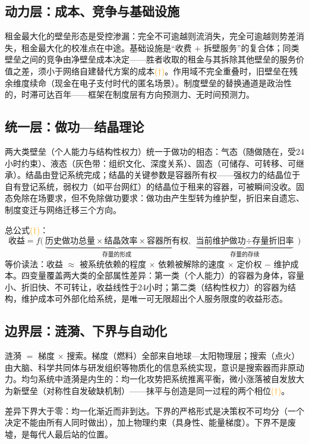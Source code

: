 \documentclass[11pt]{ctexart}
\newcommand{\infmark}{\textcolor{orange}{(\(\dagger\))}}
\begin{document}
\subsection{动力层：成本、竞争与基础设施}
租金最大化的壁垒形态是受控渗漏：完全不可逾越则流消失，完全可逾越则势差消失，租金最大化的校准点在中途。基础设施是“收费 $+$ 拆壁服务”的复合体；同类壁垒之间的竞争由净壁垒成本决定——胜者收取的租金与其拆除其他壁垒的服务价值之差，须小于网络自建替代方案的成本\infmark。作用域不完全重叠时，旧壁垒在残余维度续命（现金在电子支付时代的匿名场景）。制度壁垒的替换通道是政治性的，时滞可达百年——框架在制度层有方向预测力、无时间预测力。

\subsection{统一层：做功—结晶理论}
两大类壁垒（个人能力与结构性权力）统一于做功的相态：气态（随做随在，受24小时约束）、液态（灰色带：组织文化、深度关系）、固态（可储存、可转移、可继承）。结晶由登记系统完成；结晶的关键参数是容器所有权——强权力的结晶位于自有登记系统，弱权力（如平台网红）的结晶位于租来的容器，可被瞬间没收。固态免除在场要求，但不免除做功要求：做功由产生型转为维护型，折旧来自遗忘、制度变迁与网络迁移三个方向。

总公式\infmark：
\[
\text{收益} = f\big(\ \underbrace{\text{历史做功总量} \times \text{结晶效率} \times \text{容器所有权}}_{\text{存量的形成}},\ \underbrace{\text{当前维护做功} \div \text{存量折旧率}}_{\text{存量的存续}}\ \big)
\]
等价读法：收益 $\approx$ 被系统依赖的程度 $\times$ 依赖被解除的速度 $\times$ 定价权 $-$ 维护成本。四变量覆盖两大类的全部属性差异：第一类（个人能力）的容器为身体，容量小、折旧快、不可转让，收益线性于24小时；第二类（结构性权力）的容器为结构，维护成本可外部化给系统，是唯一可无限超出个人服务限度的收益形态。

\subsection{边界层：涟漪、下界与自动化}
涟漪 $=$ 梯度 $\times$ 搜索。梯度（燃料）全部来自地球—太阳物理层；搜索（点火）由大脑、科学共同体与研发组织等物质化的信息系统实现，意识是搜索器而非原动力。均匀系统中涟漪是内生的：均一化攻势把系统推离平衡，微小涨落被自发放大为新壁垒（对称性自发破缺机制）——抹平与创造是同一过程的两个相位\infmark。

差异下界大于零：均一化渐近而非到达。下界的严格形式是决策权不可均分（一个决定不能由所有人同时做出）\cite{arrow1951,radner1993}，加上物理约束（具身性、能量梯度）。下界不是废墟，是每代人最后站的位置。
\end{document}
